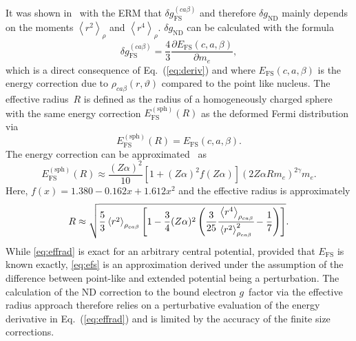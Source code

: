 It was shown in~\cite{jacek2012} with the ERM \cite{Shabaev1993} that $\delta g_{\text{FS}}^{(ca\beta)}$ and therefore $\delta g_{\text{ND}}$ mainly depends on the moments $\left< r^2 \right>_{\rho}$ and $\left< r^4 \right>_{\rho}$. $\delta g_{\text{ND}}$ can be calculated with the formula~\cite{Karshenboim2005}
\begin{equation}
\delta g^{(ca\beta)}_{\text{FS}}=\frac{4}{3}\frac{\partial E_{\text{FS}}(c,a,\beta)}{\partial m_e},
\label{eq:effrad}
\end{equation}
which is a direct consequence of Eq.~(\ref{eq:deriv}) and where $E_{\text{FS}}(c,a,\beta)$ is the energy correction due to $\rho_{ca\beta}(r,\vartheta)$ compared to the point like nucleus.
The effective radius~$R$ is defined as the radius of a homogeneously charged sphere with the same energy correction $E^{(\text{sph})}_{\text{FS}}(R)$ as the deformed Fermi distribution via
\begin{equation}
E^{(\text{sph})}_{\text{FS}}(R) = E_{\text{FS}}(c,a,\beta).
\label{eq:effradNum}
\end{equation}
The energy correction can be approximated~\cite{Shabaev1993} as
\begin{equation}
E^{(\text{sph})}_{\text{FS}}(R)\approx\frac{(Z\alpha)^2}{10}\left[{1}{+}(Z\alpha)^2f(Z\alpha) \right](2Z\alpha R m_e)^{2\gamma}m_e.
\label{eq:efs}
\end{equation}
Here, $f(x)=1.380-0.162x+1.612x^2$ and the effective radius is approximately
\small
\begin{equation}
R\approx\sqrt{\frac{5}{3}\left<r^2\right>_{\rho_{ca\beta}}\left[ 1-\frac{3}{4}(Z\alpha)^2 \left( \frac{3}{25}\cfrac{\left<r^4\right>_{\rho_{ca\beta}}}{\left<r^2\right>^2_{\rho_{ca\beta}}}-\frac{1}{7} \right) \right]}.
\label{eq:radius}
\end{equation}
\normalsize
While \eqref{eq:effrad} is exact for an arbitrary central potential, provided that $E_{\text{FS}}$ is known exactly, \eqref{eq:efs} is an approximation derived under the assumption of the difference between point-like and extended potential being a perturbation. The calculation of the ND correction to the bound electron $g$~factor via the effective radius approach therefore relies on a perturbative evaluation of the energy derivative in Eq.~(\ref{eq:effrad}) and is limited by the accuracy of the finite size corrections.

